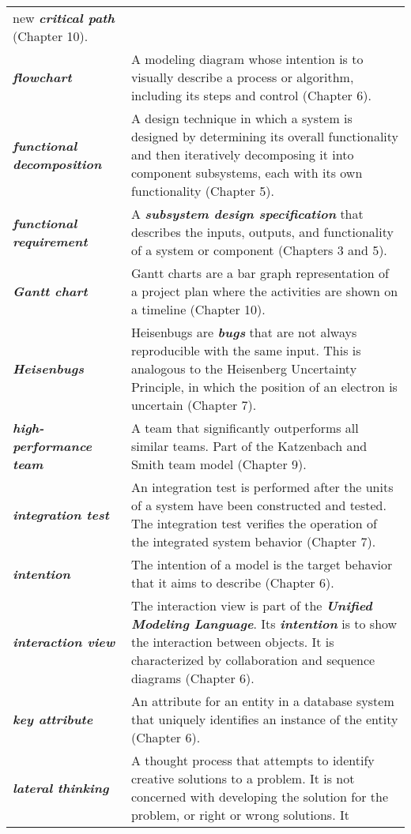 \begin{longtable}[]{@{}
  >{\raggedright\arraybackslash}p{}
  >{\raggedright\arraybackslash}p{}@{}}
new \emph{\textbf{critical path}} (Chapter 10). \\
\emph{\textbf{flowchart}} & A modeling diagram whose intention is to
visually describe a process or algorithm, including its steps and
control (Chapter 6). \\
\emph{\textbf{functional decomposition}} & A design technique in which a
system is designed by de­termining its overall functionality and then
iteratively decomposing it into component subsys­tems, each with its own
functionality (Chapter 5). \\
\emph{\textbf{functional requirement}} & A \emph{\textbf{subsystem
design specification}} that describes the inputs, outputs, and
functionality of a system or component (Chapters 3 and 5). \\
\emph{\textbf{Gantt chart}} & Gantt charts are a bar graph
representation of a project plan where the activities are shown on a
timeline (Chapter 10). \\
\emph{\textbf{Heisenbugs}} & Heisenbugs are \emph{\textbf{bugs}} that
are not always reproducible with the same input. This is analogous to
the Heisenberg Uncertainty Principle, in which the position of an
electron is uncertain (Chapter 7). \\
\emph{\textbf{high-performance team}} & A team that significantly
outperforms all similar teams. Part of the Katzenbach and Smith team
model (Chapter 9). \\
\emph{\textbf{integration test}} & An integration test is performed
after the units of a system have been constructed and tested. The
integration test verifies the operation of the integrated system
behavior (Chapter 7). \\
\emph{\textbf{intention}} & The intention of a model is the target
behavior that it aims to describe (Chapter 6). \\
\emph{\textbf{interaction view}} & The interaction view is part of the
\emph{\textbf{Unified Modeling Language}}. Its \emph{\textbf{intention}}
is to show the interaction between objects. It is characterized by
collaboration and sequence diagrams (Chapter 6). \\
\emph{\textbf{key attribute}} & An attribute for an entity in a database
system that uniquely identifies an instance of the entity (Chapter
6). \\
\emph{\textbf{lateral thinking}} & A thought process that attempts to
identify creative solutions to a problem. It is not concerned with
developing the solution for the problem, or right or wrong solutions. It

\end{longtable}
